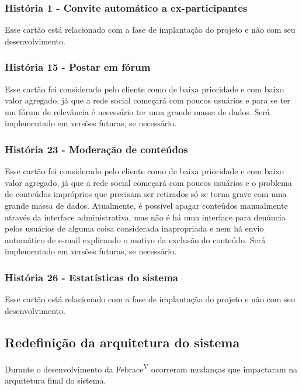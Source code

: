     \subsubsection{História 1 - Convite automático a ex-participantes}

      Esse cartão está relacionado com a fase de implantação do projeto e não com seu desenvolvimento. 

    \subsubsection{História 15 - Postar em fórum}

      Esse cartão foi considerado pelo cliente como de baixa prioridade e com baixo valor agregado, já que a rede social começará com poucos usuários e para se ter um fórum de relevância é necessário ter uma grande massa de dados. Será implementado em versões futuras, se necessário.

    \subsubsection{História 23 - Moderação de conteúdos}

      Esse cartão foi considerado pelo cliente como de baixa prioridade e com baixo valor agregado, já que a rede social começará com poucos usuários e o problema de conteúdos impróprios que precisam ser retirados só se torna grave com uma grande massa de dados. Atualmente, é possível apagar conteúdos manualmente através da interface administrativa, mas não é há uma interface para denúncia pelos usuários de alguma coisa considerada inapropriada e nem há envio automático de e-mail explicando o motivo da exclusão do conteúdo. Será implementado em versões futuras, se necessário.

    \subsubsection{História 26 - Estatísticas do sistema}

      Esse cartão está relacionado com a fase de implantação do projeto e não com seu desenvolvimento.

  \subsection{Redefinição da arquitetura do sistema}

    Durante o desenvolvimento da Febrace\textsuperscript{V} ocorreram mudanças que impactaram na arquitetura final do sistema.
    
